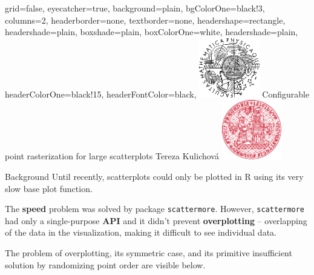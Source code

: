 \documentclass[portrait,a0paper,fontscale=0.25]{baposter}
\begin{document}
\color{black!80} %
\begin{poster}{grid=false,
	eyecatcher=true,
	background=plain,
	bgColorOne=black!3, %
	columns=2,
	headerborder=none,
	textborder=none,
	headershape=rectangle,
	headershade=plain,
	boxshade=plain,
	boxColorOne=white,
	headershade=plain,
	headerColorOne=black!15, %
	headerFontColor=black,
	}%
	{\includegraphics[height=7em]{logos/mff-black.pdf}}
	{Configurable point rasterization for large scatterplots}
	{\vspace{1ex} Tereza Kulichová}
	{\includegraphics[height=7em]{logos/uk-red.pdf}}


%
%

\begin{posterbox}[column=0,name=background,
headerColorOne=red!60, boxColorOne=red!20]{Background}
Until recently, scatterplots could only be plotted in R using its very slow base plot function. 

The \textbf{speed} problem was solved by package \texttt{scattermore}. However, \texttt{scattermore} had only a single-purpose \textbf{API} and it didn't prevent \textbf{overplotting} -- overlapping of the data in the visualization, making it difficult to see individual data.

The problem of overplotting, its symmetric case, and its primitive insufficient solution by randomizing point order are visible below.


\end{posterbox}
\end{poster}
\end{document}

